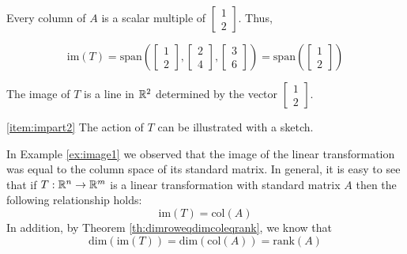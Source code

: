 \documentclass{ximera}
\begin{document}
\begin{example}
\begin{explanation}
Every column of $A$ is a scalar multiple of $\begin{bmatrix}1\\2\end{bmatrix}$.  Thus,

$$\mbox{im}(T)=\mbox{span}\left(\begin{bmatrix}1\\2\end{bmatrix}, \begin{bmatrix}2\\4\end{bmatrix}, \begin{bmatrix}3\\6\end{bmatrix}\right)=\mbox{span}\left(\begin{bmatrix}1\\2\end{bmatrix}\right)$$

The image of $T$ is a line in $\mathbb{R}^2$ determined by the vector $\begin{bmatrix}1\\2\end{bmatrix}$.

\ref{item:impart2} The action of $T$ can be illustrated with a sketch.

\begin{center}
\end{center}
\end{explanation}
\end{example}


In Example \ref{ex:image1} we observed that the image of the linear transformation was equal to the column space of its standard matrix.  In general, it is easy to see that if $T:\mathbb{R}^n\rightarrow \mathbb{R}^m$ is a linear transformation with standard matrix $A$ then the following relationship holds:
$$\mbox{im}(T)=\mbox{col}(A)$$
In addition, by Theorem \ref{th:dimroweqdimcoleqrank}, we know that
$$\mbox{dim}(\mbox{im}(T))=\mbox{dim}(\mbox{col}(A))=\mbox{rank}(A)$$
\end{document}
